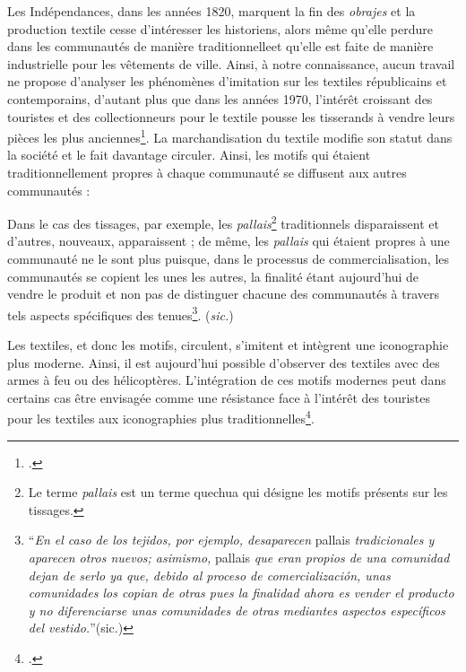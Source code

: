 Les Indépendances, dans les années 1820, marquent la fin des \textit{obrajes} et la production textile cesse d'intéresser les historiens, alors même qu'elle perdure dans les communautés de manière \og traditionnelle\fg \:et qu'elle est faite de manière industrielle pour les vêtements de ville. Ainsi, à notre connaissance, aucun travail ne propose d'analyser les phénomènes d'imitation sur les textiles républicains et contemporains, d'autant plus que dans les années 1970, l'intérêt croissant des touristes et des collectionneurs pour le textile pousse les tisserands à vendre leurs pièces les plus anciennes\footcite[p.~242]{zornModernTraditionsImpact1990}. La marchandisation du textile modifie son statut dans la société et le fait davantage circuler. Ainsi, les motifs qui étaient traditionnellement propres à chaque communauté se diffusent aux autres communautés : 
\begin{citer}
 Dans le cas des tissages, par exemple, les \textit{pallais}\footnote{Le terme \textit{pallais} est un terme quechua qui désigne les motifs présents sur les tissages.} traditionnels disparaissent et d'autres, nouveaux, apparaissent ; de même, les \textit{pallais} qui étaient propres à une communauté ne le sont plus puisque, dans le processus de commercialisation, les communautés se copient les unes les autres, la finalité étant aujourd'hui de vendre le produit et non pas de distinguer chacune des communautés à travers tels aspects spécifiques des tenues\footnote{\cite[p.~9-10]{contrerashernandezProduccionArtesanalAndes1982} \textquotedblleft \textit{En el caso de los tejidos, por ejemplo, desaparecen} pallais \textit{tradicionales y aparecen otros nuevos; asimismo,} pallais \textit{que eran propios de una comunidad dejan de serlo ya que, debido al proceso de comercialización, unas comunidades los copian de otras pues la finalidad ahora es vender el producto y no diferenciarse unas comunidades de otras mediantes aspectos específicos del vestido.}\textquotedblright \:(sic.)}. (\textit{sic.})
\end{citer}

\noindent Les textiles, et donc les motifs, circulent, s'imitent et intègrent une iconographie plus moderne. Ainsi, il est aujourd'hui possible d'observer des textiles avec des armes à feu ou des hélicoptères. L'intégration de ces motifs modernes peut dans certains cas être envisagée comme une résistance face à l'intérêt des touristes pour les textiles aux iconographies plus traditionnelles\footcite[p.~247]{zornModernTraditionsImpact1990}.\\

